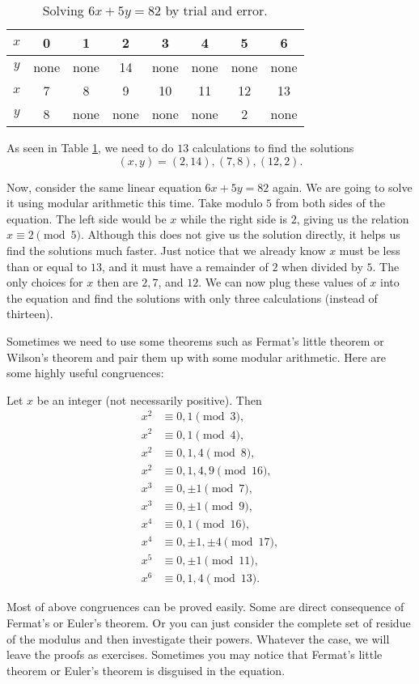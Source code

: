 \documentclass{subfile}
\begin{document}
\begin{table}[h]
\centering
\begin{tabular}{|c|c|c|c|c|c|c|c|}
\hline 
$x$ & 0 & 1 & 2 & 3 & 4 & 5 & 6 \\
\hline
$y$ & none & none & 14 & none & none & none & none \\
\hline
$x$ & 7 & 8 & 9 & 10 & 11 & 12 & 13 \\ 
\hline 
$y$ & 8 & none & none & none & none & 2 & none \\ 
\hline 
\end{tabular} 
\caption{Solving $6x+5y=82$ by trial and error.}
\label{table:diophantine}
\end{table}
			
			As seen in Table \ref{table:diophantine}, we need to do $13$ calculations to find the solutions $$(x, y)=(2,14), (7,8), (12, 2).$$
			
			Now, consider the same linear equation $6x+5y = 82$ again. We are going to solve it using modular arithmetic this time. Take modulo $5$ from both sides of the equation. The left side would be $x$ while the right side is $2$, giving us the relation $x \equiv 2 \pmod 5$. Although this does not give us the solution directly, it helps us find the solutions much faster. Just notice that we already know $x$ must be less than or equal to $13$, and it must have a remainder of $2$ when divided by $5$. The only choices for $x$ then are $2, 7$, and $12$. We can now plug these values of $x$ into the equation and find the solutions with only three calculations (instead of thirteen). 
			
			
			Sometimes we need to use some theorems such as Fermat's little theorem or Wilson's theorem and pair them up with some modular arithmetic. Here are some highly useful congruences:
				\begin{theorem}\label{thm:diophModulo}
					Let $x$ be an integer (not necessarily positive). Then
					\begin{align*}
					x^2 & \equiv 0,1 \pmod3,\\
					x^2 & \equiv 0,1 \pmod4,\\
					x^2 & \equiv 0,1,4\pmod8,\\
					x^2 & \equiv 0,1,4,9 \pmod{16},\\
					x^3 & \equiv 0, \pm1 \pmod7,\\
					x^3 & \equiv 0, \pm1 \pmod9,\\
					x^4 & \equiv 0,1 \pmod{16},\\
					x^4 & \equiv 0, \pm 1, \pm 4 \pmod{17},\\
					x^5 & \equiv 0, \pm1 \pmod{11},\\
					x^6 & \equiv 0,1,4 \pmod{13}.
					\end{align*}
				\end{theorem}
			Most of above congruences can be proved easily. Some are direct consequence of Fermat's or Euler's theorem. Or you can just consider the complete set of residue of the modulus and then investigate their powers. Whatever the case, we will leave the proofs as exercises. Sometimes you may notice that Fermat's little theorem or Euler's theorem is disguised in the equation.
			
\end{document}
